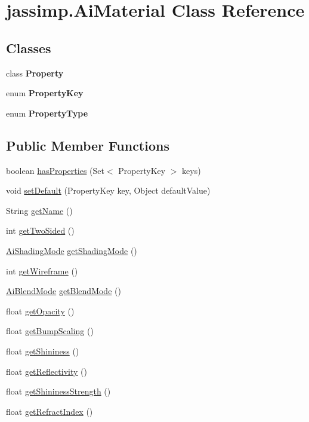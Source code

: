 \hypertarget{classjassimp_1_1_ai_material}{\section{jassimp.\+Ai\+Material Class Reference}
\label{classjassimp_1_1_ai_material}
}
\subsection*{Classes}
\begin{DoxyCompactItemize}
\item 
class {\bfseries Property}
\item 
enum {\bfseries Property\+Key}
\item 
enum {\bfseries Property\+Type}
\end{DoxyCompactItemize}
\subsection*{Public Member Functions}
\begin{DoxyCompactItemize}
\item 
boolean \hyperlink{classjassimp_1_1_ai_material_ab002fcfc715b4eca1c79b2b4335ee792}{has\+Properties} (Set$<$ Property\+Key $>$ keys)
\item 
void \hyperlink{classjassimp_1_1_ai_material_aa4b48d6639e41b94824bfd1113d603ae}{set\+Default} (Property\+Key key, Object default\+Value)
\item 
String \hyperlink{classjassimp_1_1_ai_material_a13f6e272122bb3389cda3c6476cf301d}{get\+Name} ()
\item 
int \hyperlink{classjassimp_1_1_ai_material_a62ea603f2abb941022fb4138f873eee8}{get\+Two\+Sided} ()
\item 
\hyperlink{enumjassimp_1_1_ai_shading_mode}{Ai\+Shading\+Mode} \hyperlink{classjassimp_1_1_ai_material_a112e5e1f723d397c9710860a980c2cdc}{get\+Shading\+Mode} ()
\item 
int \hyperlink{classjassimp_1_1_ai_material_a6a9b99b27fb0b988b5923a00bb6456a7}{get\+Wireframe} ()
\item 
\hyperlink{enumjassimp_1_1_ai_blend_mode}{Ai\+Blend\+Mode} \hyperlink{classjassimp_1_1_ai_material_ae86ba03c053112591c6aa8cc7d6ecc13}{get\+Blend\+Mode} ()
\item 
float \hyperlink{classjassimp_1_1_ai_material_a7e6c0bb48069c0fbc6fe9700b1baf3ad}{get\+Opacity} ()
\item 
float \hyperlink{classjassimp_1_1_ai_material_aa04329ffc3486652ecc1cce2266b52ff}{get\+Bump\+Scaling} ()
\item 
float \hyperlink{classjassimp_1_1_ai_material_aef6ae978aa8a17ba9e9e1ea6f2079fb2}{get\+Shininess} ()
\item 
float \hyperlink{classjassimp_1_1_ai_material_a031f2d48b21dbc3c1fce601af6473f37}{get\+Reflectivity} ()
\item 
float \hyperlink{classjassimp_1_1_ai_material_ab2a892bb40d70044d2a57df3b3d8895e}{get\+Shininess\+Strength} ()
\item 
float \hyperlink{classjassimp_1_1_ai_material_a60334cbfa4d0a20dc70ae4c78f0842bb}{get\+Refract\+Index} ()
\end{DoxyCompactItemize}


